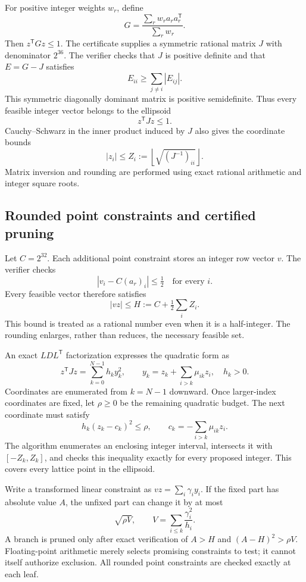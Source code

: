 \documentclass[11pt,a4paper]{article}
\begin{document}
For positive integer weights $w_r$, define
\[
G=\frac{\sum_r w_ra_ra_r^{\mathsf T}}{\sum_r w_r}.
\]
Then $z^{\mathsf T}Gz\le1$. The certificate supplies a symmetric rational matrix $J$ with denominator $2^{36}$. The verifier checks that $J$ is positive definite and that $E=G-J$ satisfies
\[
E_{ii}\ge\sum_{j\ne i}|E_{ij}|.
\]
This symmetric diagonally dominant matrix is positive semidefinite. Thus every feasible integer vector belongs to the ellipsoid
\begin{equation}\label{eq:ellipsoid}
z^{\mathsf T}Jz\le1.
\end{equation}
Cauchy--Schwarz in the inner product induced by $J$ also gives the coordinate bounds
\begin{equation}\label{eq:coordinates}
|z_i|\le Z_i:=\left\lfloor\sqrt{(J^{-1})_{ii}}\right\rfloor.
\end{equation}
Matrix inversion and rounding are performed using exact rational arithmetic and integer square roots.

\subsection{Rounded point constraints and certified pruning}
Let $C=2^{32}$. Each additional point constraint stores an integer row vector $v$. The verifier checks
\[
|v_i-C(a_r)_i|\le\tfrac12\quad\text{for every }i.
\]
Every feasible vector therefore satisfies
\begin{equation}\label{eq:rounded}
|vz|\le H:=C+\tfrac12\sum_i Z_i.
\end{equation}
This bound is treated as a rational number even when it is a half-integer. The rounding enlarges, rather than reduces, the necessary feasible set.

An exact $LDL^{\mathsf T}$ factorization expresses the quadratic form as
\[
z^{\mathsf T}Jz=\sum_{k=0}^{N-1}h_k y_k^2,\qquad
y_k=z_k+\sum_{i>k}\mu_{ik}z_i,\quad h_k>0.
\]
Coordinates are enumerated from $k=N-1$ downward. Once larger-index coordinates are fixed, let $\rho\ge0$ be the remaining quadratic budget. The next coordinate must satisfy
\[
h_k(z_k-c_k)^2\le\rho,\qquad
c_k=-\sum_{i>k}\mu_{ik}z_i.
\]
The algorithm enumerates an enclosing integer interval, intersects it with $[-Z_k,Z_k]$, and checks this inequality exactly for every proposed integer. This covers every lattice point in the ellipsoid.

Write a transformed linear constraint as $vz=\sum_i\gamma_i y_i$. If the fixed part has absolute value $A$, the unfixed part can change it by at most
\[
\sqrt{\rho V},\qquad V=\sum_{i\le k}\frac{\gamma_i^2}{h_i}.
\]
A branch is pruned only after exact verification of $A>H$ and $(A-H)^2>\rho V$. Floating-point arithmetic merely selects promising constraints to test; it cannot itself authorize exclusion. All rounded point constraints are checked exactly at each leaf.
\end{document}
